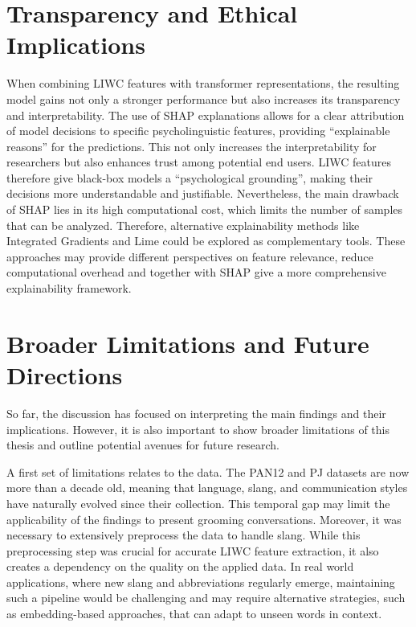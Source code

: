 \section{Transparency and Ethical Implications}

When combining LIWC features with transformer representations, the resulting model gains not only a stronger performance but also increases its transparency and interpretability. The use of SHAP explanations allows for a clear attribution of model decisions to specific psycholinguistic features, providing “explainable reasons” for the predictions. This not only increases the interpretability for researchers but also enhances trust among potential end users. LIWC features therefore give black-box models a “psychological grounding”, making their decisions more understandable and justifiable. Nevertheless, the main drawback of SHAP lies in its high computational cost, which limits the number of samples that can be analyzed. Therefore, alternative explainability methods like Integrated Gradients\cite{integratedgradients} and Lime \cite{ribeiro2016lime} could be explored as complementary tools. These approaches may provide different perspectives on feature relevance, reduce computational overhead and together with SHAP give a more comprehensive explainability framework.

\section{Broader Limitations and Future Directions}

So far, the discussion has focused on interpreting the main findings and their implications. However, it is also important to show broader limitations of this thesis and outline potential avenues for future research.  

A first set of limitations relates to the data. The PAN12 and PJ datasets are now more than a decade old, meaning that language, slang, and communication styles have naturally evolved since their collection. This temporal gap may limit the applicability of the findings to present grooming conversations. Moreover, it was necessary to extensively preprocess the data to handle slang. While this preprocessing step was crucial for accurate LIWC feature extraction, it also creates a dependency on the quality on the applied data. In real world applications, where new slang and abbreviations regularly emerge, maintaining such a pipeline would be challenging and may require alternative strategies, such as embedding-based approaches, that can adapt to unseen words in context.  

